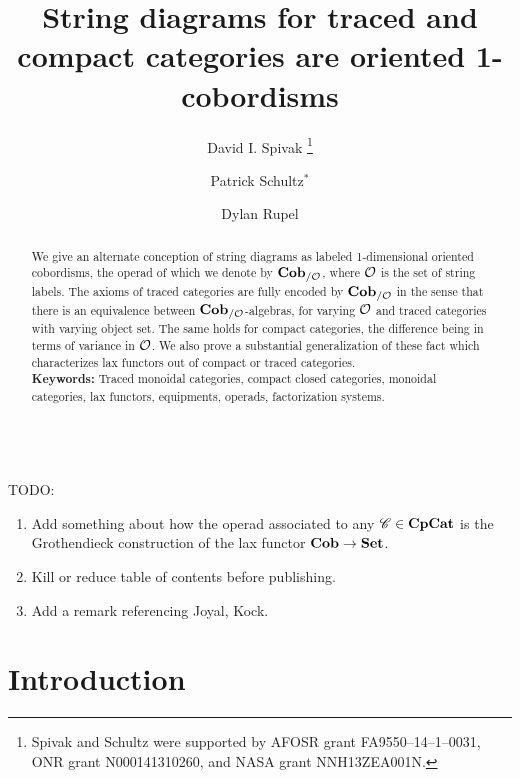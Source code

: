 \documentclass[11pt,oneside,article]{memoir}
\title{String diagrams for traced and compact categories are oriented 1-cobordisms}
\author{
   David I. Spivak%
      \thanks{Spivak and Schultz were supported by AFOSR grant FA9550--14--1--0031, ONR grant N000141310260, and NASA grant NNH13ZEA001N.}
   \and Patrick Schultz${}^*$%
   \and Dylan Rupel
}
\date{\vspace{-3ex}}
\begin{document}
\firmlists*

\maketitle
\begin{abstract}
   We give an alternate conception of string diagrams as labeled 1-dimensional oriented cobordisms,
   the operad of which we denote by $\mathbf{Cob}_{/\mathcal{O}}$, where $\mathcal{O}$ is the set of string labels.
   The axioms of traced categories are fully encoded by $\mathbf{Cob}_{/\mathcal{O}}$ in the sense that there is
   an equivalence between $\mathbf{Cob}_{/\mathcal{O}}$-algebras, for varying $\mathcal{O}$ and traced categories
   with varying object set. The same holds for compact categories, the difference being in terms of
   variance in $\mathcal{O}$. We also prove a substantial generalization of these fact which
   characterizes lax functors out of compact or traced categories. \\

   \noindent\textbf{Keywords:} Traced monoidal categories, compact closed categories, monoidal categories, lax functors, equipments, operads, factorization systems.
\end{abstract}

~\\
TODO:
\begin{enumerate}
\item Add something about how the operad associated to any $\mathscr{C}\in\mathbf{CpCat}$ is the Grothendieck construction of the lax functor $\mathbf{Cob}\to\mathbf{Set}$.
\item Kill or reduce table of contents before publishing.
\item Add a remark referencing Joyal, Kock.
\end{enumerate}

\tableofcontents

\chapter{Introduction}\label{chap:intro}
\end{document}
